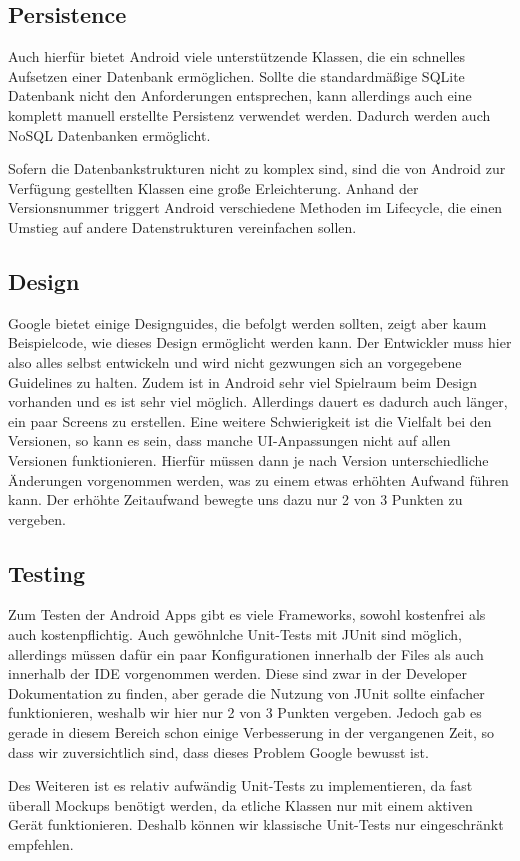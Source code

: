 \subsection{Persistence}
Auch hierfür bietet Android viele unterstützende Klassen, die ein schnelles Aufsetzen einer Datenbank ermöglichen. Sollte die standardmäßige SQLite Datenbank nicht den Anforderungen entsprechen, kann allerdings auch eine komplett manuell erstellte Persistenz verwendet werden. Dadurch werden auch NoSQL Datenbanken ermöglicht.

Sofern die Datenbankstrukturen nicht zu komplex sind, sind die von Android zur Verfügung gestellten Klassen eine große Erleichterung. Anhand der Versionsnummer triggert Android verschiedene Methoden im Lifecycle, die einen Umstieg auf andere Datenstrukturen vereinfachen sollen.

\subsection{Design}
Google bietet einige Designguides, die befolgt werden sollten, zeigt aber kaum Beispielcode, wie dieses Design ermöglicht werden kann. Der Entwickler muss hier also alles selbst entwickeln und wird nicht gezwungen sich an vor\-ge\-gebene Guidelines zu halten. Zudem ist in Android sehr viel Spielraum beim Design vorhanden und es ist sehr viel möglich. Allerdings dauert es dadurch auch länger, ein paar Screens zu erstellen. Eine weitere Schwierigkeit ist die Vielfalt bei den Versionen, so kann es sein, dass manche UI-An\-passungen nicht auf allen Versionen funktionieren. Hierfür müssen dann je nach Version unterschiedliche Änderungen vorgenommen werden, was zu einem etwas erhöhten Aufwand führen kann. Der erhöhte Zeitaufwand bewegte uns dazu nur 2 von 3 Punkten zu vergeben.

\subsection{Testing}
Zum Testen der Android Apps gibt es viele Frameworks, sowohl kostenfrei als auch kostenpflichtig. Auch gewöhnlche Unit-Tests mit JUnit sind möglich, allerdings müssen dafür ein paar Konfigurationen innerhalb der Files als auch innerhalb der IDE vorgenommen werden. Diese sind zwar in der Developer Dokumentation zu finden, aber gerade die Nutzung von JUnit sollte einfacher funktionieren, weshalb wir hier nur 2 von 3 Punkten vergeben. Jedoch gab es gerade in diesem Bereich schon einige Verbesserung in der vergangenen Zeit, so dass wir zuversichtlich sind, dass dieses Problem Google bewusst ist.

Des Weiteren ist es relativ aufwändig Unit-Tests zu implementieren, da fast überall Mockups benötigt werden, da etliche Klassen nur mit einem aktiven Gerät funktionieren. Deshalb können wir klassische Unit-Tests nur eingeschränkt empfehlen.
